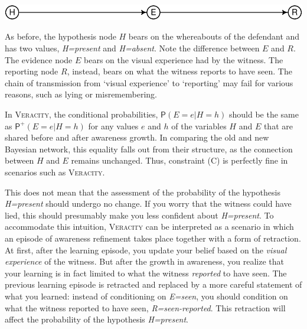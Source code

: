 \documentclass[
  11pt,
  dvipsnames,enabledeprecatedfontcommands]{scrartcl}
\newcommand{\pr}[1]{\ensuremath{\mathsf{P}(#1)}}
\newcommand{\ppr}[2]{\ensuremath{\mathsf{P}^{#1}(#2)}}
\begin{document}
\begin{center}\includegraphics[width=0.5\linewidth,height=0.3\textheight]{ReplyToSteeleStefansson5_files/figure-latex/veracityDAG-1} \end{center}

\noindent As before, the hypothesis node \(H\) bears on the whereabouts
of the defendant and has two values, \textit{H=present} and
\textit{H=absent}. Note the difference between \(E\) and \(R\). The
evidence node \(E\) bears on the visual experience had by the witness.
The reporting node \(R\), instead, bears on what the witness reports to
have seen. The chain of transmission from `visual experience' to
`reporting' may fail for various reasons, such as lying or
misremembering.

In \textsc{Veracity}, the conditional probabilities,
\(\pr{E=e \vert H=h}\) should be the same as \(\ppr{+}{E=e \vert H=h}\)
for any values \(e\) and \(h\) of the variables \(H\) and \(E\) that are
shared before and after awareness growth. In comparing the old and new
Bayesian network, this equality falls out from their structure, as the
connection between \(H\) and \(E\) remains unchanged. Thus, constraint
(C) is perfectly fine in scenarios such as \textsc{Veracity}.

This does not mean that the assessment of the probability of the
hypothesis \textit{H=present} should undergo no change. If you worry
that the witness could have lied, this should presumably make you less
confident about \textit{H=present}. To accommodate this intuition,
\textsc{Veracity} can be interpreted as a scenario in which an episode
of awareness refinement takes place together with a form of retraction.
At first, after the learning episode, you update your belief based on
the \textit{visual experience} of the witness. But after the growth in
awareness, you realize that your learning is in fact limited to what the
witness \textit{reported} to have seen. The previous learning episode is
retracted and replaced by a more careful statement of what you learned:
instead of conditioning on \textit{E=seen}, you should condition on what
the witness reported to have seen, \textit{R=seen-reported}. This
retraction will affect the probability of the hypothesis
\textit{H=present}.
\end{document}
